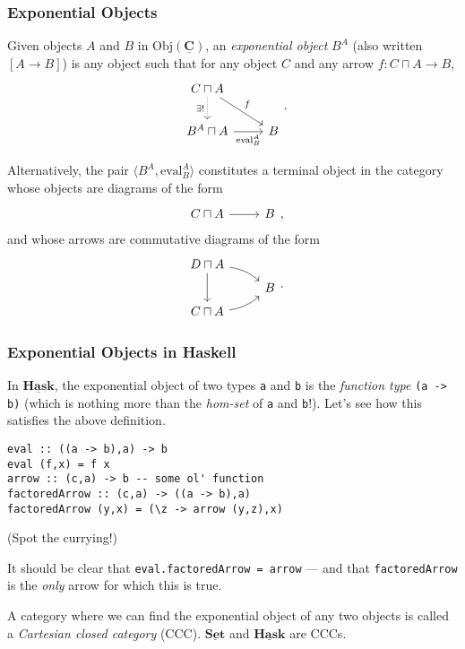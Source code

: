 \documentclass[10pt]{beamer}
\newcommand{\Cat}[1]{\ensuremath{\underline{\mathbf{#1}}}}
\newcommand{\Obj}[1]{\ensuremath{\mathrm{Obj}(\Cat{#1})}}
\theoremstyle{definition}
\theoremstyle{remark}
\numberwithin{equation}{section}
\begin{document}
\begin{frame}[fragile]
  \frametitle{Exponential Objects}

  Given objects $A$ and $B$ in $\Obj{C}$, an \emph{exponential object} $B^A$
  (also written $[A \rightarrow B]$) is any object such that for any object $C$ and any
  arrow $f\colon C \sqcap A \rightarrow B$,
  \[
    \begin{tikzcd}
      C \sqcap A \arrow[swap,densely dotted]{d}{\exists!} \arrow{dr}{f} & \\
      B^A \sqcap A \arrow[swap]{r}{\mathrm{eval}_B^A} & B
    \end{tikzcd}\rlap{.}
  \]

  Alternatively, the pair $\langle {B^A,\mathrm{eval}_B^A} \rangle$ constitutes a terminal
  object in the category whose objects are diagrams of the form
  \[
    \begin{tikzcd}
      C \sqcap A \arrow{r} & B
    \end{tikzcd}\rlap{,}
  \]
  and whose arrows are commutative diagrams of the form
  \[
    \begin{tikzcd}[row sep=tiny]
      D \sqcap A \arrow{dd} \arrow[bend left=15]{dr} & \\
      & B \\
      C \sqcap A \arrow[bend right=15]{ur} &
    \end{tikzcd}\rlap{.}
  \]
\end{frame}

\begin{frame}
  \frametitle{Exponential Objects in Haskell}

  In $\Cat{Hask}$, the exponential object of two types \lstinline{a} and
  \lstinline{b} is the \emph{function type} \lstinline{(a -> b)} (which is
  nothing more than the \emph{hom-set} of \lstinline{a} and \lstinline{b}!). Let's see
  how this satisfies the above definition.

\begin{lstlisting}[frame=single]
eval :: ((a -> b),a) -> b
eval (f,x) = f x
arrow :: (c,a) -> b -- some ol' function
factoredArrow :: (c,a) -> ((a -> b),a)
factoredArrow (y,x) = (\z -> arrow (y,z),x)
\end{lstlisting}
  {\footnotesize{(Spot the currying!)}}

  It should be clear that \lstinline{eval.factoredArrow = arrow} --- and that
  \lstinline{factoredArrow} is the \emph{only} arrow for which this is true.

  A category where we can find the exponential object of any two objects is
  called a \emph{Cartesian closed category} (CCC). $\Cat{Set}$ and $\Cat{Hask}$
  are CCCs.
\end{frame}
\end{document}
